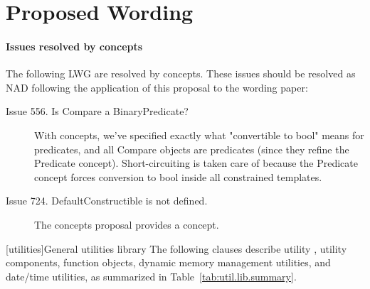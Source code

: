 \documentclass[american,twoside]{book}
\begin{document}
\begin{titlepage}
\end{titlepage}

\section*{Proposed Wording}
\paragraph*{Issues resolved by concepts}
The following LWG are resolved by concepts. These issues should be
resolved as NAD following the application of this proposal to the
wording paper:
\begin{description}
\item[Issue 556. Is Compare a BinaryPredicate?] With concepts, we've
  specified exactly what "convertible to bool" means for predicates,
  and all Compare objects are predicates (since they refine the
  Predicate concept). Short-circuiting is taken care of because the
  Predicate concept forces conversion to bool inside all constrained
  templates.
\item[Issue 724. DefaultConstructible is not defined.]
The concepts proposal provides a  concept.
\end{description}

\pagestyle{fancy}
\fancyhead[LE,RO]{\textbf{\rightmark}}
\fancyhead[RE]{\textbf{\leftmark\hspace{1em}\thepage}}
\fancyhead[LO]{\textbf{\thepage\hspace{1em}\leftmark}}


\renewcommand{\sectionmark}[1]{\markright{\thesection\hspace{1em}#1}}
\renewcommand{\chaptermark}[1]{\markboth{#1}{}}

\setcounter{chapter}{19}
[utilities]{General utilities library}
\setcounter{Paras}{1}
\textcolor{black}{\pnum}
The following clauses describe utility  , utility
components,  function objects, dynamic
memory management utilities, and date/time utilities, as summarized in
Table~\ref{tab:util.lib.summary}.
\end{document}
